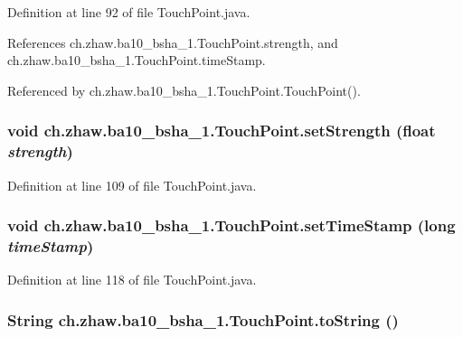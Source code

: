 Definition at line 92 of file TouchPoint.java.

References ch.zhaw.ba10\_\-bsha\_\-1.TouchPoint.strength, and ch.zhaw.ba10\_\-bsha\_\-1.TouchPoint.timeStamp.

Referenced by ch.zhaw.ba10\_\-bsha\_\-1.TouchPoint.TouchPoint().\hypertarget{classch_1_1zhaw_1_1ba10__bsha__1_1_1TouchPoint_acccafc087a2fd76987d8f829390626d7}{
\subsubsection[{setStrength}]{\setlength{\rightskip}{0pt plus 5cm}void ch.zhaw.ba10\_\-bsha\_\-1.TouchPoint.setStrength (float {\em strength})}}
\label{classch_1_1zhaw_1_1ba10__bsha__1_1_1TouchPoint_acccafc087a2fd76987d8f829390626d7}


Definition at line 109 of file TouchPoint.java.\hypertarget{classch_1_1zhaw_1_1ba10__bsha__1_1_1TouchPoint_aae69659dd478457f14287116e34f868e}{
\subsubsection[{setTimeStamp}]{\setlength{\rightskip}{0pt plus 5cm}void ch.zhaw.ba10\_\-bsha\_\-1.TouchPoint.setTimeStamp (long {\em timeStamp})}}
\label{classch_1_1zhaw_1_1ba10__bsha__1_1_1TouchPoint_aae69659dd478457f14287116e34f868e}


Definition at line 118 of file TouchPoint.java.\hypertarget{classch_1_1zhaw_1_1ba10__bsha__1_1_1TouchPoint_a4e930068dfcb62f5ff8a7dd60ae2a04c}{
\subsubsection[{toString}]{\setlength{\rightskip}{0pt plus 5cm}String ch.zhaw.ba10\_\-bsha\_\-1.TouchPoint.toString ()}}
\label{classch_1_1zhaw_1_1ba10__bsha__1_1_1TouchPoint_a4e930068dfcb62f5ff8a7dd60ae2a04c}


